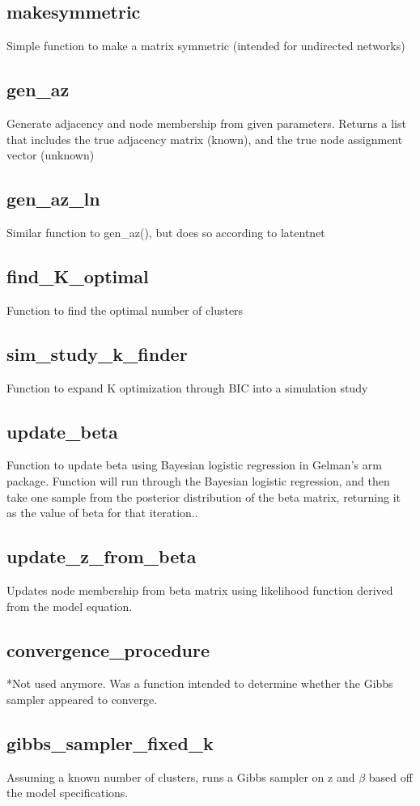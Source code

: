 \subsection*{makesymmetric}
Simple function to make a matrix symmetric (intended for undirected networks)
\subsection*{gen_az}
Generate adjacency and node membership from given parameters. Returns a list that includes the true adjacency matrix (known), and the true node assignment vector (unknown)
\subsection*{gen_az_ln}
Similar function to gen_az(), but does so according to latentnet
\subsection*{find_K_optimal}
Function to find the optimal number of clusters
\subsection*{sim_study_k_finder}
Function to expand K optimization through BIC into a simulation study
\subsection*{update_beta}
Function to update beta using Bayesian logistic regression in Gelman's arm package. Function will run through the Bayesian logistic regression, and then take one sample from the posterior distribution of the beta matrix, returning it as the value of beta for that iteration..
\subsection*{update_z_from_beta}
Updates node membership from beta matrix using likelihood function derived from the model equation.
\subsection*{convergence_procedure}
*Not used anymore. Was a function intended to determine whether the Gibbs sampler appeared to converge.
\subsection*{gibbs_sampler_fixed_k}
Assuming a known number of clusters, runs a Gibbs sampler on z and $\beta$ based off the model specifications.
